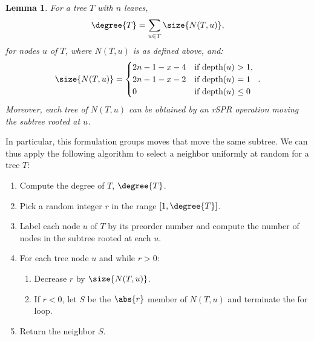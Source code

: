 \documentclass[11pt,onecolumn,conference]{IEEEtran}
\newtheorem{lemma}[theorem]{Lemma}
\newcommand{\cuttable}[2][]{%
    \ifthenelse{\equal{#1}{}}%
		{}%
		{#1}%
}
\begin{document}
\begin{lemma}
	\label{lem:compute_degree}
	For a tree $T$ with $n$ leaves,
	$$\degree{T} = \sum_{u \in T} \size{N(T,u)},$$
	for nodes $u$ of $T$, where $N(T,u)$ is as defined above, and:
	$$\size{N(T,u)} = \begin{cases}
		2n - 1 - x - 4 &\text{if depth($u$) $ > 1$, } \\
		2n - 1 - x - 2 &\text{if depth($u$) $ = 1$ } \\
		0 &\text{if depth($u$) $ \le 0$ } \\
	\end{cases}.$$
	Moreover, each tree of $N(T,u)$ can be obtained by an rSPR operation moving the subtree rooted at $u$.
\end{lemma}
\cuttable{
\begin{proof}
	The statement follows if each of the neighbor assignments are disjoint, that is $N(T,u) \cap N(T,v) = \emptyset$, for all nodes $u$, $v$ of $T$.
	So, suppose, for the purpose of obtaining a contradiction, that there exist two nodes $u$ and $v$ of $T$ such that there exists a tree $S \in (N(T,u) \cap N(T,v))$.
	Then $S$ can be obtained from $T$ by moving the subtrees rooted at $u$ or $v$.
	Call these $U$ and $V$, respectively.
	This implies that both $T \setminus U = S \setminus U$ and $T \setminus V = S \setminus V$ by the definition of an rSPR operation.
	Then the rSPR moves that move $U$ or $V$ to obtain $S$ must be nearest neighbor interchanges (NNIs), that is, rSPR moves which move their subtree to one of four locations: their grandparent edge, aunt edge, sibling's left child edge or sibling's right child edge.
	This implies that, without loss of generality, $U$ is moved to its grandparent edge and $V$ to $U's$ sibling (i.e. (iii) above) or $U$ is moved to its aunt edge and $V$ to $U$'s edge (i.e. iv above), a contradiction.
	Therefore the claim holds.
\end{proof}
}


In particular, this formulation groups moves that move the same subtree.
We can thus apply the following algorithm to select a neighbor uniformly at random for a tree $T$:

\begin{enumerate}[label={\arabic*}.]
	\item	Compute the degree of $T$, $\degree{T}$.
	\item Pick a random integer $r$ in the range $[1,\degree{T}]$.
	\item Label each node $u$ of $T$ by its preorder number and compute the number of nodes in the subtree rooted at each $u$.
\item For each tree node $u$ and while $r > 0$:
	\begin{enumerate}
		\item Decrease $r$ by $\size{N(T,u)}$.
		\item If $r < 0$, let $S$ be the $\abs{r}$ member of $N(T,u)$ and terminate the for loop.
	\end{enumerate}
\item Return the neighbor $S$.
\end{enumerate}
\end{document}
